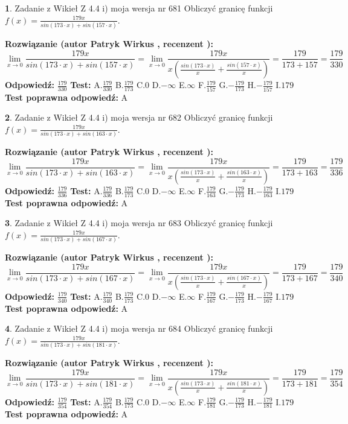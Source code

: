 \documentclass[12pt, a4paper]{article}
\theoremstyle{definition} %
\newtheorem{zad}{}
\newcommand{\zadStart}[1]{\begin{zad}#1\newline}
\newcommand{\zadStop}{\end{zad}}
\newcommand{\rozwStart}[2]{\noindent \textbf{Rozwiązanie (autor #1 , recenzent #2): }\newline}
\newcommand{\rozwStop}{\newline}
\newcommand{\odpStart}{\noindent \textbf{Odpowiedź:}\newline}
\newcommand{\odpStop}{\newline}
\newcommand{\testStart}{\noindent \textbf{Test:}\newline}
\newcommand{\testStop}{\newline}
\newcommand{\kluczStart}{\noindent \textbf{Test poprawna odpowiedź:}\newline}
\newcommand{\kluczStop}{\newline}
\begin{document}
\zadStart{Zadanie z Wikieł Z 4.4 i) moja wersja nr 681}
Obliczyć granicę funkcji $f(x)=\frac{179x}{sin(173\cdot x) +sin(157\cdot x)}$.
\zadStop
\rozwStart{Patryk Wirkus}{}
$$\lim\limits_{x\to 0}\frac{179x}{sin(173\cdot x) +sin(157\cdot x)}=\lim\limits_{x\to 0}\frac{179x}{x(\frac{sin(173\cdot x)}{x}+\frac{sin(157\cdot x)}{x})}=\frac{179}{173+157} = \frac{179}{330}$$
\rozwStop
\odpStart
$\frac{179}{330}$
\odpStop
\testStart
A.$\frac{179}{330}$
B.$\frac{179}{173}$
C.$0$
D.$-\infty$
E.$\infty$
F.$\frac{179}{157}$
G.$-\frac{179}{173}$
H.$-\frac{179}{157}$
I.$179$
\testStop
\kluczStart
A
\kluczStop



\zadStart{Zadanie z Wikieł Z 4.4 i) moja wersja nr 682}
Obliczyć granicę funkcji $f(x)=\frac{179x}{sin(173\cdot x) +sin(163\cdot x)}$.
\zadStop
\rozwStart{Patryk Wirkus}{}
$$\lim\limits_{x\to 0}\frac{179x}{sin(173\cdot x) +sin(163\cdot x)}=\lim\limits_{x\to 0}\frac{179x}{x(\frac{sin(173\cdot x)}{x}+\frac{sin(163\cdot x)}{x})}=\frac{179}{173+163} = \frac{179}{336}$$
\rozwStop
\odpStart
$\frac{179}{336}$
\odpStop
\testStart
A.$\frac{179}{336}$
B.$\frac{179}{173}$
C.$0$
D.$-\infty$
E.$\infty$
F.$\frac{179}{163}$
G.$-\frac{179}{173}$
H.$-\frac{179}{163}$
I.$179$
\testStop
\kluczStart
A
\kluczStop



\zadStart{Zadanie z Wikieł Z 4.4 i) moja wersja nr 683}
Obliczyć granicę funkcji $f(x)=\frac{179x}{sin(173\cdot x) +sin(167\cdot x)}$.
\zadStop
\rozwStart{Patryk Wirkus}{}
$$\lim\limits_{x\to 0}\frac{179x}{sin(173\cdot x) +sin(167\cdot x)}=\lim\limits_{x\to 0}\frac{179x}{x(\frac{sin(173\cdot x)}{x}+\frac{sin(167\cdot x)}{x})}=\frac{179}{173+167} = \frac{179}{340}$$
\rozwStop
\odpStart
$\frac{179}{340}$
\odpStop
\testStart
A.$\frac{179}{340}$
B.$\frac{179}{173}$
C.$0$
D.$-\infty$
E.$\infty$
F.$\frac{179}{167}$
G.$-\frac{179}{173}$
H.$-\frac{179}{167}$
I.$179$
\testStop
\kluczStart
A
\kluczStop



\zadStart{Zadanie z Wikieł Z 4.4 i) moja wersja nr 684}
Obliczyć granicę funkcji $f(x)=\frac{179x}{sin(173\cdot x) +sin(181\cdot x)}$.
\zadStop
\rozwStart{Patryk Wirkus}{}
$$\lim\limits_{x\to 0}\frac{179x}{sin(173\cdot x) +sin(181\cdot x)}=\lim\limits_{x\to 0}\frac{179x}{x(\frac{sin(173\cdot x)}{x}+\frac{sin(181\cdot x)}{x})}=\frac{179}{173+181} = \frac{179}{354}$$
\rozwStop
\odpStart
$\frac{179}{354}$
\odpStop
\testStart
A.$\frac{179}{354}$
B.$\frac{179}{173}$
C.$0$
D.$-\infty$
E.$\infty$
F.$\frac{179}{181}$
G.$-\frac{179}{173}$
H.$-\frac{179}{181}$
I.$179$
\testStop
\kluczStart
A
\kluczStop
\end{document}
